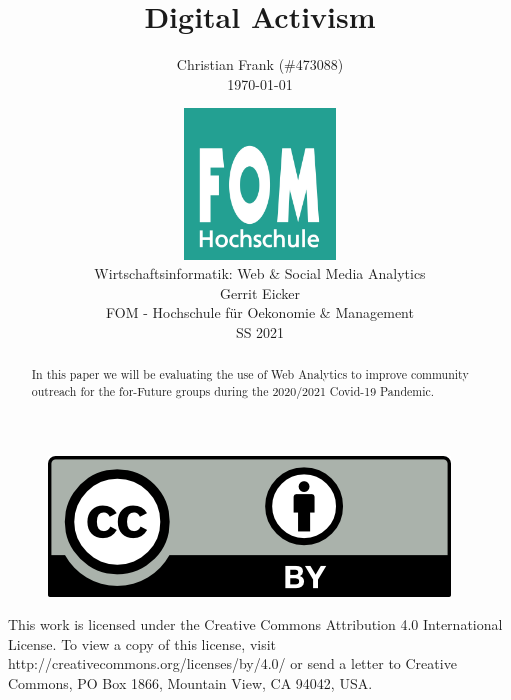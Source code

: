 \documentclass[12pt,a4paper,listof=totoc,bibliography=totoc]{scrartcl}
\newcommand\svthema{Digital Activism}
\newcommand\svperson{Christian Frank (\#473088)}
\newcommand\svdatum{\today}
\newcommand\lvname{Wirtschaftsinformatik: Web \& Social Media Analytics}
\newcommand\lvtyp{SS 2021}
\newcommand\lvinst{FOM - Hochschule für Oekonomie \& Management}
\newcommand\lvbetr{Gerrit Eicker}
\begin{document}
\title{ \huge\textbf{\svthema} }
\author{ {\svperson} \\ \svdatum }
\date{ \normalsize \centering \includegraphics[width=0.3\textwidth]{FOM}\\ {\lvname} \\ {\lvbetr} \\ {\lvinst} \\ {\lvtyp} }

\pagestyle{fancy}
\fancyhf{}
\fancyhf[ch]{\thepage}
\renewcommand\headrulewidth{0pt}

\maketitle
\thispagestyle{empty} %

\begin{abstract}
In this paper we will be evaluating the use of Web Analytics to improve community outreach for the for-Future groups during the 2020/2021 Covid-19 Pandemic.

\end{abstract}

\vfill
\begin{figure}[h]
    \centering
    \includegraphics[]{CC-BY}
\end{figure}

This work is licensed under the Creative Commons Attribution 4.0 International License. To view a copy of this license, visit http://creativecommons.org/licenses/by/4.0/ or send a letter to Creative Commons, PO Box 1866, Mountain View, CA 94042, USA.

\cleardoublepage
\end{document}
